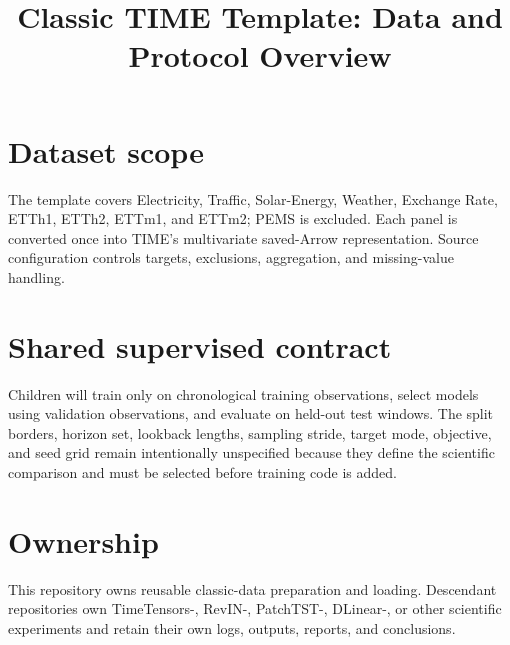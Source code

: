 \documentclass[10pt]{article}
\title{Classic TIME Template: Data and Protocol Overview}
\author{}
\date{}
\begin{document}
\maketitle

\section{Dataset scope}

The template covers Electricity, Traffic, Solar-Energy, Weather, Exchange
Rate, ETTh1, ETTh2, ETTm1, and ETTm2; PEMS is excluded. Each panel is converted
once into TIME's multivariate saved-Arrow representation. Source configuration
controls targets, exclusions, aggregation, and missing-value handling.

\section{Shared supervised contract}

Children will train only on chronological training observations, select models
using validation observations, and evaluate on held-out test windows. The
split borders, horizon set, lookback lengths, sampling stride, target mode,
objective, and seed grid remain intentionally unspecified because they define
the scientific comparison and must be selected before training code is added.

\section{Ownership}

This repository owns reusable classic-data preparation and loading. Descendant
repositories own TimeTensors-, RevIN-, PatchTST-, DLinear-, or other scientific
experiments and retain their own logs, outputs, reports, and conclusions.
\end{document}
